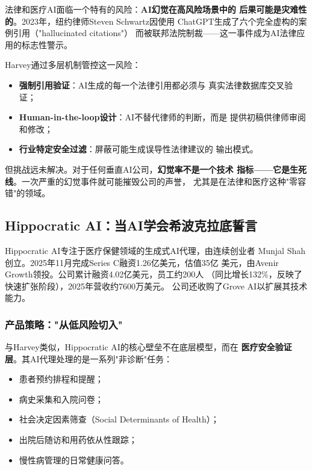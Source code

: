 \begin{warnbox}
法律和医疗AI面临一个特有的风险：\textbf{AI幻觉在高风险场景中的
后果可能是灾难性的}。2023年，纽约律师Steven Schwartz因使用
ChatGPT生成了六个完全虚构的案例引用（"hallucinated citations"）
而被联邦法院制裁——这一事件成为AI法律应用的标志性警示。

Harvey通过多层机制管控这一风险：
\begin{itemize}
  \item \textbf{强制引用验证}：AI生成的每一个法律引用都必须与
    真实法律数据库交叉验证；
  \item \textbf{Human-in-the-loop设计}：AI不替代律师的判断，而是
    提供初稿供律师审阅和修改；
  \item \textbf{行业特定安全过滤}：屏蔽可能生成误导性法律建议的
    输出模式。
\end{itemize}

但挑战远未解决。对于任何垂直AI公司，\textbf{幻觉率不是一个技术
指标——它是生死线}。一次严重的幻觉事件就可能摧毁公司的声誉，
尤其是在法律和医疗这种"零容错"的领域。
\end{warnbox}

\subsection{Hippocratic AI：当AI学会希波克拉底誓言}
\label{subsec:hippocratic}

Hippocratic AI专注于医疗保健领域的生成式AI代理，由连续创业者
Munjal Shah创立。2025年11月完成Series C融资1.26亿美元，估值35亿
美元，由Avenir Growth领投。公司累计融资4.02亿美元，员工约200人
（同比增长132\%，反映了快速扩张阶段），2025年营收约7600万美元。
公司还收购了Grove AI以扩展其技术能力。

\subsubsection{产品策略："从低风险切入"}
与Harvey类似，Hippocratic AI的核心壁垒不在底层模型，而在
\textbf{医疗安全验证层}。其AI代理处理的是一系列"非诊断"任务：
\begin{itemize}
  \item 患者预约排程和提醒；
  \item 病史采集和入院问卷；
  \item 社会决定因素筛查（Social Determinants of Health）；
  \item 出院后随访和用药依从性跟踪；
  \item 慢性病管理的日常健康问答。
\end{itemize}


